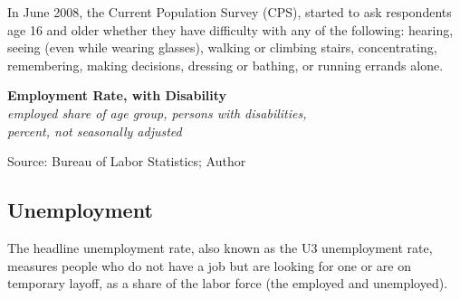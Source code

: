 \documentclass{report}
\makeatletter
\newcommand{\tbllink}[1]{\href{https://raw.githubusercontent.com/bdecon/US-chartbook/master/chartbook/data/#1}{\faTable}}
\newcommand*\short[1]{\expandafter\@gobbletwo\number\numexpr#1\relax}
\newcommand{\absnode}[3]{\node[below right, align=left] at (axis cs: #1,#2) {#3};}
\newcommand{\dateaxisticks}{
		date coordinates in=x, axis line style={draw=none},
		xmax={2023-11-01},
		max space between ticks=40,	    
		xtick={{1990-01-01}, {1992-01-01}, {1994-01-01}, 
			{1996-01-01}, {1998-01-01}, {2000-01-01}, 
			{2002-01-01}, {2004-01-01}, {2006-01-01},
			{2008-01-01}, {2010-01-01}, {2012-01-01}, {2014-01-01},
		    {2016-01-01}, {2018-01-01}, {2020-01-01}, {2022-01-01}, 
		    {2024-01-01}, {2026-01-01}},
		minor xtick={{1989-01-01}, {1991-01-01}, {1993-01-01},
			{1995-01-01}, {1997-01-01}, {1999-01-01}, 
			{2001-01-01}, {2003-01-01}, {2005-01-01}, {2007-01-01},
		    {2009-01-01}, {2011-01-01}, {2013-01-01}, {2015-01-01},
		    {2017-01-01}, {2019-01-01}, {2021-01-01}, {2023-01-01}, 
		    {2025-01-01}, {2027-01-01}},
		enlarge y limits={0.06}, enlarge x limits={0.01},
		}
\newcommand{\bbar}[2]{extra #1 ticks = {{#2}}, extra #1 tick labels = ,
		extra #1 tick style = {grid=major, grid style={thick, black!25}},}
\newcommand{\stdline}[4]{\addplot[very thick, no markers, color=#1] 
		table [x=#2, y=#3, col sep=comma] {#4};	}
\newcommand{\recbars}{
		\fill[color=black!10] (axis cs:{2007-12-01},\pgfkeysvalueof{/pgfplots/ymin}) rectangle 
			(axis cs:{2009-07-01}, \pgfkeysvalueof{/pgfplots/ymax});
		\fill[color=black!10] (axis cs:{2020-02-01},\pgfkeysvalueof{/pgfplots/ymin}) rectangle 
			(axis cs:{2020-05-01}, \pgfkeysvalueof{/pgfplots/ymax});}
\makeatother
\begin{document}
{\begin{minipage}{0.76\textwidth}
In June 2008, the Current Population Survey (CPS), started to ask respondents age 16 and older whether they have difficulty with any of the following: hearing, seeing (even while wearing glasses), walking or climbing stairs, concentrating, remembering, making decisions, dressing or bathing, or running errands alone.  
\end{minipage}

\begin{minipage}{0.43\textwidth} 
\normalsize \textbf{Employment Rate, with Disability}\\
\footnotesize{\textit{employed share of age group, persons with disabilities,}}\\
\footnotesize{\textit{percent, not seasonally adjusted}}
\vspace{5.6cm}

\hspace{4mm} 

\footnotesize{Source: Bureau of Labor Statistics; Author} \hfill \tbllink{dis_emp_rate_bls.csv} \ \ \tbllink{dis_emp_rate_cps.csv}
\end{minipage} \hspace{5mm}
\begin{minipage}{0.29\textwidth} 
\small  

 
\end{minipage}
\newpage
\vspace*{-10mm}

\begin{minipage}{0.76\textwidth} 
\subsection*{Unemployment}
\hypertarget{labu}{\label{labu}}
\vspace{-0.5mm}
\small The headline unemployment rate, also known as the U3 unemployment rate, measures people who do not have a job but are looking for one or are on temporary layoff, as a share of the labor force (the employed and unemployed). 
\end{minipage}

}
\end{document}
